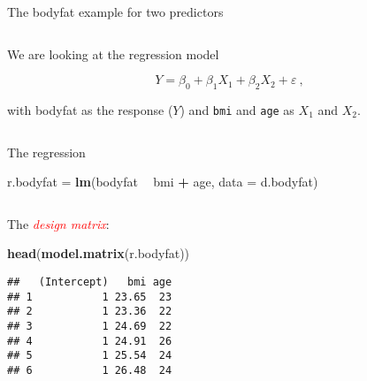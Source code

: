 \documentclass[10pt,ignorenonframetext,]{beamer}
\newenvironment{Shaded}{\begin{snugshade}}{\end{snugshade}}
\newcommand{\DataTypeTok}[1]{\textcolor[rgb]{0.13,0.29,0.53}{#1}}
\newcommand{\KeywordTok}[1]{\textcolor[rgb]{0.13,0.29,0.53}{\textbf{#1}}}
\newcommand{\NormalTok}[1]{#1}
\newcommand{\OperatorTok}[1]{\textcolor[rgb]{0.81,0.36,0.00}{\textbf{#1}}}
\newcommand{\StringTok}[1]{\textcolor[rgb]{0.31,0.60,0.02}{#1}}
\begin{document}
\begin{frame}[fragile]

\begin{block}{The bodyfat example for two predictors}

\(~\)

We are looking at the regression model

\begin{equation*}
Y = \beta_0 + \beta_{1}  X_1 + \beta_2 X_2  + \varepsilon \ ,
\end{equation*}

with bodyfat as the response (\(Y\)) and \texttt{bmi} and \texttt{age}
as \(X_1\) and \(X_2\).

\(~\)

\normalsize

The regression

\scriptsize

\begin{Shaded}
\begin{Highlighting}[]
\NormalTok{r.bodyfat =}\StringTok{ }\KeywordTok{lm}\NormalTok{(bodyfat }\OperatorTok{~}\StringTok{ }\NormalTok{bmi }\OperatorTok{+}\StringTok{ }\NormalTok{age, }\DataTypeTok{data =}\NormalTok{ d.bodyfat)}
\end{Highlighting}
\end{Shaded}

\(~\)

\normalsize

The \emph{\textcolor{red}{design matrix}}:

\scriptsize

\begin{Shaded}
\begin{Highlighting}[]
\KeywordTok{head}\NormalTok{(}\KeywordTok{model.matrix}\NormalTok{(r.bodyfat))}
\end{Highlighting}
\end{Shaded}

\begin{verbatim}
##   (Intercept)   bmi age
## 1           1 23.65  23
## 2           1 23.36  22
## 3           1 24.69  22
## 4           1 24.91  26
## 5           1 25.54  24
## 6           1 26.48  24
\end{verbatim}

\normalsize

\end{block}

\end{frame}
\end{document}
